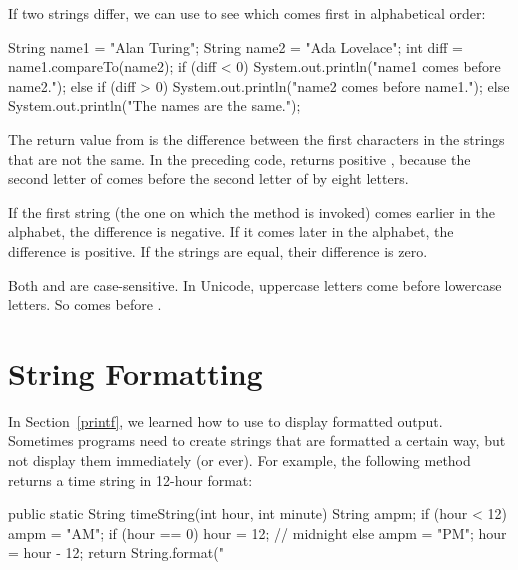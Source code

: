 
If two strings differ, we can use  to see which comes first in alphabetical order:

\begin{code}
String name1 = "Alan Turing";
String name2 = "Ada Lovelace";
int diff = name1.compareTo(name2);
if (diff < 0) {
    System.out.println("name1 comes before name2.");
} else if (diff > 0) {
    System.out.println("name2 comes before name1.");
} else {
    System.out.println("The names are the same.");
}
\end{code}

The return value from  is the difference between the first characters in the strings that are not the same.
In the preceding code,  returns positive , because the second letter of  comes before the second letter of  by eight letters.

If the first string (the one on which the method is invoked) comes earlier in the alphabet, the difference is negative.
If it comes later in the alphabet, the difference is positive.
If the strings are equal, their difference is zero.


Both  and  are case-sensitive.
In Unicode, uppercase letters come before lowercase letters.
So  comes before .


\section{String Formatting}


In Section~\ref{printf}, we learned how to use  to display formatted output.
Sometimes programs need to create strings that are formatted a certain way, but not display them immediately (or ever).
For example, the following method returns a time string in 12-hour format:

\begin{code}
public static String timeString(int hour, int minute) {
    String ampm;
    if (hour < 12) {
        ampm = "AM";
        if (hour == 0) {
            hour = 12;  // midnight
        }
    } else {
        ampm = "PM";
        hour = hour - 12;
    }
    return String.format("%
}
\end{code}

